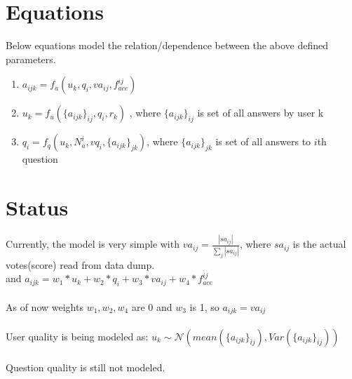 \documentclass{article}
\begin{document}
\section*{Equations}
Below equations model the relation/dependence between
the above defined parameters. \\
\begin{enumerate}
    \item $a_{ijk} = f_a(u_k, q_i, va_{ij}, f_{acc}^{ij})$
    \item $u_k = f_u(\{a_{ijk}\}_{ij}, q_i, r_k)$ , where $\{a_{ijk}\}_{ij}$
        is set of all answers by user k
    \item $q_i = f_q(u_k, N_{a}^{i}, vq_i, \{a_{ijk}\}_{jk})$, where $\{a_{ijk}\}_{jk}$
        is set of all answers to $i$th question
\end{enumerate}

\section*{Status}
Currently, the model is very simple with $va_{ij} = \frac{|sa_{ij}|}{\sum_{j} |sa_{ij}|}$, where $sa_{ij}$ is the actual votes(score) read from data dump.\\
and $a_{ijk} = w_1*u_k + w_2*q_i + w_3*va_{ij} + w_4*f_{acc}^{ij}$ \\
\\
As of now weights $w_1, w_2, w_4$ are 0 and $w_3$ is 1, so $a_{ijk} = va_{ij}$ \\
\\
User quality is being modeled as: $u_k \sim \mathcal{N} (mean(\{a_{ijk}\}_{ij}), Var(\{a_{ijk}\}_{ij}))$ \\
\\
Question quality is still not modeled.
\end{document}

